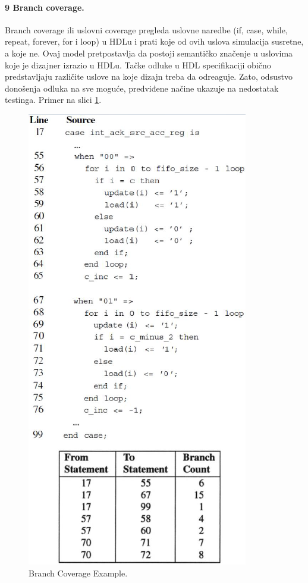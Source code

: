 \documentclass[a4paper, 12pt]{article}
\begin{document}
\paragraph{9 Branch coverage.}
\hfill \break
\indent Branch coverage ili uslovni coverage pregleda uslovne naredbe (if, case, while, repeat, forever, for i loop) u HDLu i prati koje od ovih uslova simulacija susretne, a koje ne. Ovaj model pretpostavlja da postoji semantičko značenje u uslovima koje je dizajner izrazio u HDLu. Tačke odluke u HDL specifikaciji obično predstavljaju različite uslove na koje dizajn treba da odreaguje. Zato, odsustvo donošenja odluka na sve moguće, predviđene načine ukazuje na nedostatak testinga. Primer na slici \ref{img-p10-6}.
\begin{figure}[h!]
\centering
\includegraphics[scale=0.6]{img-p10-6.png}
\caption{Branch Coverage Example.}
\label{img-p10-6}
\end{figure}
\end{document}
